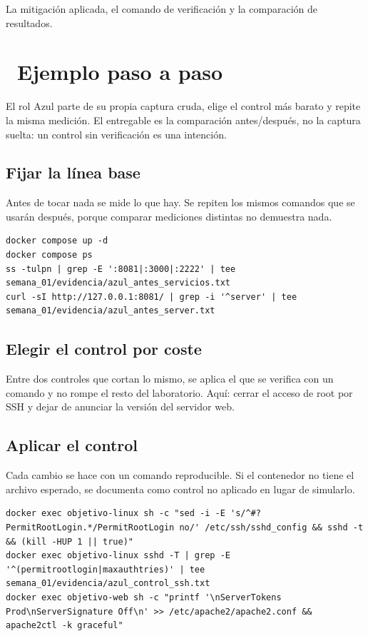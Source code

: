 \documentclass[11pt,a4paper]{article}
\newcommand{\iconotexto}[2]{\textcolor{cyanNeon}{\faIcon{#1}}~#2}
\begin{document}
La mitigación aplicada, el comando de verificación y la comparación de resultados.

\section{\iconotexto{list-ol}{Ejemplo paso a paso}}

El rol Azul parte de su propia captura cruda, elige el control más barato y repite la misma medición. El entregable es la comparación antes/después, no la captura suelta: un control sin verificación es una intención.

\subsection{Fijar la línea base}

Antes de tocar nada se mide lo que hay. Se repiten los mismos comandos que se usarán después, porque comparar mediciones distintas no demuestra nada.

\begin{lstlisting}[style=estiloCodigo]
docker compose up -d
docker compose ps
ss -tulpn | grep -E ':8081|:3000|:2222' | tee semana_01/evidencia/azul_antes_servicios.txt
curl -sI http://127.0.0.1:8081/ | grep -i '^server' | tee semana_01/evidencia/azul_antes_server.txt
\end{lstlisting}

\subsection{Elegir el control por coste}

Entre dos controles que cortan lo mismo, se aplica el que se verifica con un comando y no rompe el resto del laboratorio. Aquí: cerrar el acceso de root por SSH y dejar de anunciar la versión del servidor web.

\subsection{Aplicar el control}

Cada cambio se hace con un comando reproducible. Si el contenedor no tiene el archivo esperado, se documenta como control no aplicado en lugar de simularlo.

\begin{lstlisting}[style=estiloCodigo]
docker exec objetivo-linux sh -c "sed -i -E 's/^#?PermitRootLogin.*/PermitRootLogin no/' /etc/ssh/sshd_config && sshd -t && (kill -HUP 1 || true)"
docker exec objetivo-linux sshd -T | grep -E '^(permitrootlogin|maxauthtries)' | tee semana_01/evidencia/azul_control_ssh.txt
docker exec objetivo-web sh -c "printf '\nServerTokens Prod\nServerSignature Off\n' >> /etc/apache2/apache2.conf && apache2ctl -k graceful"
\end{lstlisting}
\end{document}
